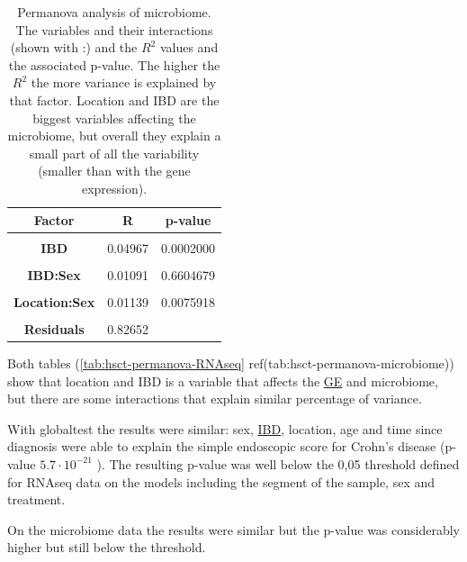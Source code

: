 \documentclass[
  12pt,
  a4paper,
  twoside,
  openright]{book}
\begin{document}
\begin{table}[H]

\caption[Permanova analysis of microbiome]{\label{tab:hsct-permanova-microbiome}Permanova analysis of microbiome. The variables and their interactions (shown with :) and the $R^2$ values and the associated p-value. The higher the $R^2$ the more variance is explained by that factor. Location and IBD are the biggest variables affecting the microbiome, but overall they explain a small part of all the variability (smaller than with the gene expression).}
\centering
\begin{tabular}[t]{>{}c|c|c}
\hline
\textbf{Factor} & \textbf{R} & \textbf{p-value}\\
\hline
\textbf{\cellcolor{gray!6}{Location}} & \cellcolor{gray!6}{0.06061} & \cellcolor{gray!6}{0.0002000}\\
\hline
\textbf{IBD} & 0.04967 & 0.0002000\\
\hline
\textbf{\cellcolor{gray!6}{Sex}} & \cellcolor{gray!6}{0.01712} & \cellcolor{gray!6}{0.0003999}\\
\hline
\textbf{IBD:Sex} & 0.01091 & 0.6604679\\
\hline
\textbf{\cellcolor{gray!6}{Location:IBD}} & \cellcolor{gray!6}{0.02089} & \cellcolor{gray!6}{0.8476305}\\
\hline
\textbf{Location:Sex} & 0.01139 & 0.0075918\\
\hline
\textbf{\cellcolor{gray!6}{Location:IBD:Sex}} & \cellcolor{gray!6}{0.00289} & \cellcolor{gray!6}{0.9994001}\\
\hline
\textbf{Residuals} & 0.82652 & \\
\hline
\end{tabular}
\end{table}

Both tables (\ref{tab:hsct-permanova-RNAseq} \textbar ref(tab:hsct-permanova-microbiome)) show that location and IBD is a variable that affects the \protect\hyperlink{acronyms_GE}{GE} and microbiome, but there are some interactions that explain similar percentage of variance.

With globaltest the results were similar: sex, \protect\hyperlink{acronyms_IBD}{IBD}, location, age and time since diagnosis were able to explain the simple endoscopic score for Crohn's disease (p-value \(5.7 \cdot 10^{-21}\) ).
The resulting p-value was well below the 0,05 threshold defined for RNAseq data on the models including the segment of the sample, sex and treatment.

On the microbiome data the results were similar but the p-value was considerably higher but still below the threshold.
\end{document}
